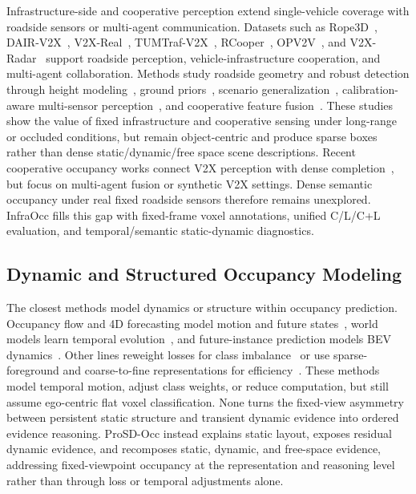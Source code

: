 Infrastructure-side and cooperative perception extend single-vehicle coverage
with roadside sensors or multi-agent communication. Datasets such as
Rope3D~\cite{Rope3D}, DAIR-V2X~\cite{DAIRV2X}, V2X-Real~\cite{V2XReal},
TUMTraf-V2X~\cite{TUMTrafV2X}, RCooper~\cite{RCooper}, OPV2V~\cite{OPV2V}, and
V2X-Radar~\cite{V2XRadar} support roadside perception, vehicle-infrastructure
cooperation, and multi-agent collaboration. Methods study roadside geometry and
robust detection through height modeling~\cite{BEVHeight,BEVHeightPP}, ground
priors~\cite{MonoGAE}, scenario generalization~\cite{SGV3D}, calibration-aware
multi-sensor perception~\cite{SIFormer}, and cooperative feature
fusion~\cite{V2XViT,Where2comm,Coopernaut,bai2024sgdet3d,bai2026rags,bai2026rc,
zheng2026doracamom}. These studies show the value of fixed infrastructure and
cooperative sensing under long-range or occluded conditions, but remain
object-centric and produce sparse boxes rather than dense static/dynamic/free
space scene descriptions. Recent cooperative occupancy works connect V2X
perception with dense completion~\cite{CollaborativeSemanticOcc,
SyntheticCollaborativeOcc}, but focus on multi-agent fusion or synthetic V2X
settings. Dense semantic occupancy under real fixed roadside sensors therefore
remains unexplored. InfraOcc fills this gap with fixed-frame voxel annotations,
unified C/L/C+L evaluation, and temporal/semantic static-dynamic diagnostics.


\subsection{Dynamic and Structured Occupancy Modeling}
\label{sec:related_structured}

The closest methods model dynamics or structure within occupancy prediction.
Occupancy flow and 4D forecasting model motion and future
states~\cite{Cam4DOcc,LetOccFlow,UniOcc}, world models learn temporal
evolution~\cite{OccWorld}, and future-instance prediction models BEV
dynamics~\cite{FIERY}. Other lines reweight losses for class
imbalance~\cite{FocalLoss,ClassBalancedLoss} or use sparse-foreground and
coarse-to-fine representations for efficiency~\cite{SparseOcc,COTR}. These
methods model temporal motion, adjust class weights, or reduce computation, but
still assume ego-centric flat voxel classification. None turns the fixed-view
asymmetry between persistent static structure and transient dynamic evidence
into ordered evidence reasoning. ProSD-Occ instead explains static layout,
exposes residual dynamic evidence, and recomposes static, dynamic, and free-space
evidence, addressing fixed-viewpoint occupancy at the representation and
reasoning level rather than through loss or temporal adjustments alone.

